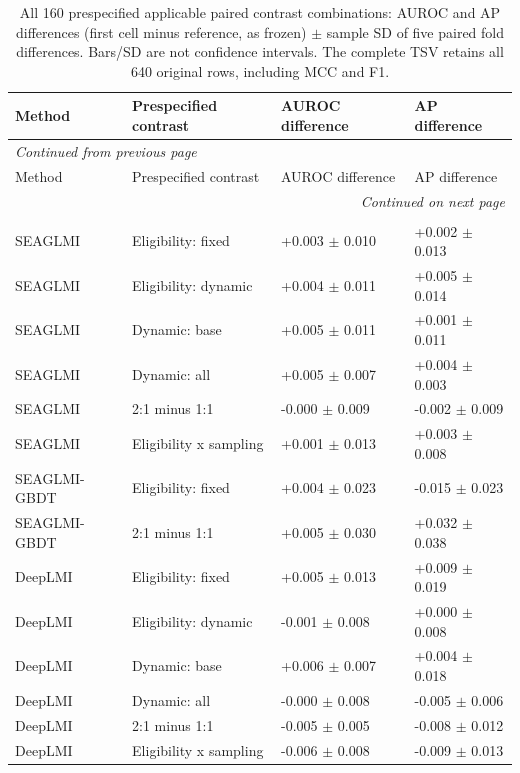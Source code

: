 {\scriptsize
\setlength{\tabcolsep}{4pt}
\renewcommand{\arraystretch}{1.08}
\begin{longtable}{llll}
\caption{All 160 prespecified applicable paired contrast combinations: AUROC and AP differences (first cell minus reference, as frozen) $\pm$ sample SD of five paired fold differences. Bars/SD are not confidence intervals. The complete TSV retains all 640 original rows, including MCC and F1.}\label{tab:screened-B-contrasts}\\
\toprule
Method & Prespecified contrast & AUROC difference & AP difference \\
\midrule
\endfirsthead
\multicolumn{4}{l}{\textit{Continued from previous page}}\\
\toprule
Method & Prespecified contrast & AUROC difference & AP difference \\
\midrule
\endhead
\midrule
\multicolumn{4}{r}{\textit{Continued on next page}}\\
\endfoot
\bottomrule
\endlastfoot
\multicolumn{4}{l}{\textit{Strict | Inherited warm split | outer 1:1}}\\
SEAGLMI & Eligibility: fixed & +0.003 $\pm$ 0.010 & +0.002 $\pm$ 0.013 \\
SEAGLMI & Eligibility: dynamic & +0.004 $\pm$ 0.011 & +0.005 $\pm$ 0.014 \\
SEAGLMI & Dynamic: base & +0.005 $\pm$ 0.011 & +0.001 $\pm$ 0.011 \\
SEAGLMI & Dynamic: all & +0.005 $\pm$ 0.007 & +0.004 $\pm$ 0.003 \\
SEAGLMI & 2:1 minus 1:1 & -0.000 $\pm$ 0.009 & -0.002 $\pm$ 0.009 \\
SEAGLMI & Eligibility x sampling & +0.001 $\pm$ 0.013 & +0.003 $\pm$ 0.008 \\
SEAGLMI-GBDT & Eligibility: fixed & +0.004 $\pm$ 0.023 & -0.015 $\pm$ 0.023 \\
SEAGLMI-GBDT & 2:1 minus 1:1 & +0.005 $\pm$ 0.030 & +0.032 $\pm$ 0.038 \\
DeepLMI & Eligibility: fixed & +0.005 $\pm$ 0.013 & +0.009 $\pm$ 0.019 \\
DeepLMI & Eligibility: dynamic & -0.001 $\pm$ 0.008 & +0.000 $\pm$ 0.008 \\
DeepLMI & Dynamic: base & +0.006 $\pm$ 0.007 & +0.004 $\pm$ 0.018 \\
DeepLMI & Dynamic: all & -0.000 $\pm$ 0.008 & -0.005 $\pm$ 0.006 \\
DeepLMI & 2:1 minus 1:1 & -0.005 $\pm$ 0.005 & -0.008 $\pm$ 0.012 \\
DeepLMI & Eligibility x sampling & -0.006 $\pm$ 0.008 & -0.009 $\pm$ 0.013 \\

\end{longtable}}
